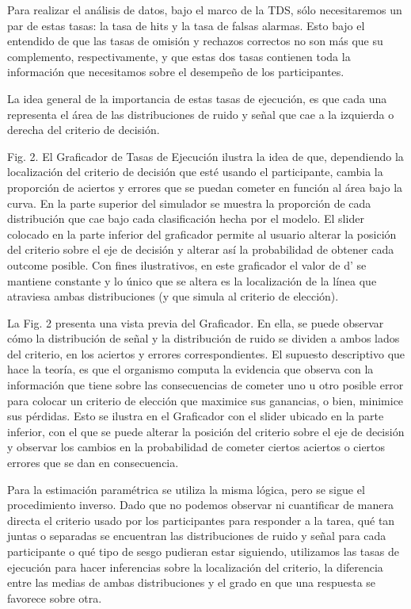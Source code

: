 Para realizar el análisis de datos, bajo el marco de la TDS, sólo necesitaremos un par de estas tasas: la tasa de hits y la tasa de falsas alarmas. Esto bajo el entendido de que las tasas de omisión y rechazos correctos no son más que su complemento, respectivamente, y que estas dos tasas contienen toda la información que necesitamos sobre el desempeño de los participantes.

La idea general de la importancia de estas tasas de ejecución, es que cada una representa el área de las distribuciones de ruido y señal que cae a la izquierda o derecha del criterio de decisión.

Fig. 2. El Graficador de Tasas de Ejecución ilustra la idea de que, dependiendo la localización del criterio de decisión que esté usando el participante, cambia la proporción de aciertos y errores que se puedan cometer en función al área bajo la curva. En la parte superior del simulador se muestra la proporción de cada distribución que cae bajo cada clasificación hecha por el modelo. El slider colocado en la parte inferior del graficador permite al usuario alterar la posición del criterio sobre el eje de decisión y alterar así la probabilidad de obtener cada outcome posible.  Con fines ilustrativos, en este graficador el valor de d’ se mantiene constante y lo único que se altera es la localización de la línea que atraviesa ambas distribuciones (y que simula al criterio de elección).

La Fig. 2 presenta una vista previa del Graficador. En ella, se puede observar cómo la distribución de señal y la distribución de ruido se dividen a ambos lados del criterio, en los aciertos y errores correspondientes. El supuesto descriptivo que hace la teoría, es que el organismo computa la evidencia que observa con la información que tiene sobre las consecuencias de cometer uno u otro posible error para colocar un criterio de elección que maximice sus ganancias, o bien, minimice sus pérdidas.  Esto se ilustra en el Graficador con el slider ubicado en la parte inferior, con el que se puede alterar la posición del criterio sobre el eje de decisión y observar los cambios en la probabilidad de cometer ciertos aciertos o ciertos errores que se dan en consecuencia.

Para la estimación paramétrica se utiliza la misma lógica, pero se sigue el procedimiento inverso. Dado que no podemos observar ni cuantificar de manera directa el criterio usado por los participantes para responder a la tarea, qué tan juntas o separadas se encuentran las distribuciones de ruido y señal para cada participante o qué tipo de sesgo pudieran estar siguiendo, utilizamos las tasas de ejecución para hacer inferencias sobre la localización del criterio, la diferencia entre las medias de ambas distribuciones y el grado en que una respuesta se favorece sobre otra. 


